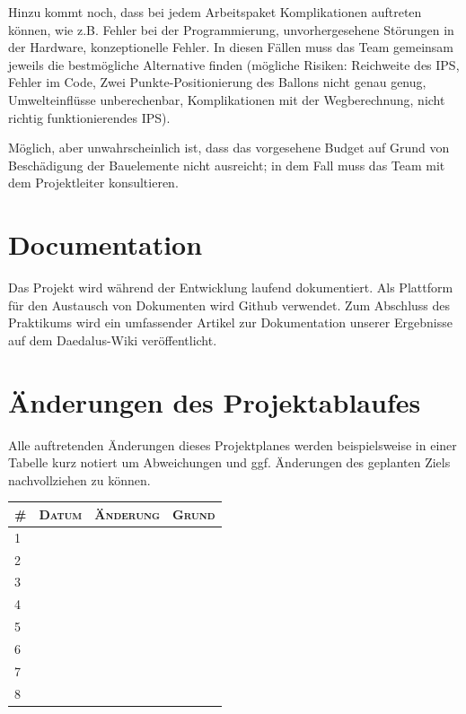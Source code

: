 \documentclass[lang=ngerman,inputenc=utf8,fontsize=10pt]{ldvarticle}
\begin{document}
Hinzu kommt noch, dass bei jedem Arbeitspaket Komplikationen auftreten können, wie z.B. Fehler bei der Programmierung, unvorhergesehene Störungen in der Hardware, konzeptionelle Fehler. In diesen Fällen muss das Team gemeinsam jeweils die bestmögliche Alternative finden (mögliche Risiken: Reichweite des IPS, Fehler im Code, Zwei Punkte-Positionierung des Ballons nicht genau genug, Umwelteinflüsse unberechenbar, Komplikationen mit der Wegberechnung, nicht richtig funktionierendes IPS).


Möglich, aber unwahrscheinlich ist, dass das vorgesehene Budget auf Grund von Beschädigung der Bauelemente nicht ausreicht; in dem Fall muss das Team mit dem Projektleiter konsultieren.

\section{Documentation}
Das Projekt wird während der Entwicklung laufend dokumentiert. Als Plattform für den Austausch von Dokumenten wird Github verwendet. Zum Abschluss des Praktikums wird ein umfassender Artikel zur Dokumentation unserer Ergebnisse auf dem Daedalus-Wiki veröffentlicht.

\section{Änderungen des Projektablaufes}
Alle auftretenden Änderungen dieses Projektplanes werden beispielsweise in einer Tabelle kurz notiert um Abweichungen und ggf. Änderungen des geplanten Ziels nachvollziehen zu können.



\begin{tabular}[htbp]{|p{}||p{}|p{}|p{}|}
	\hline
	\textsc{\#} & \textsc{Datum} & \textsc{Änderung} & \textsc{Grund} \\
	\hline
	\hline
	1 & & & \\[1em]
	\hline
	2 & & & \\[1em]
	\hline
	3 & & & \\[1em]
	\hline
	4 & & & \\[1em]
	\hline
	5 & & & \\[1em]
	\hline
	6 & & & \\[1em]
	\hline
	7 & & & \\[1em]
	\hline
	8 & & & \\[1em]
	\hline
\end{tabular}
\end{document}
